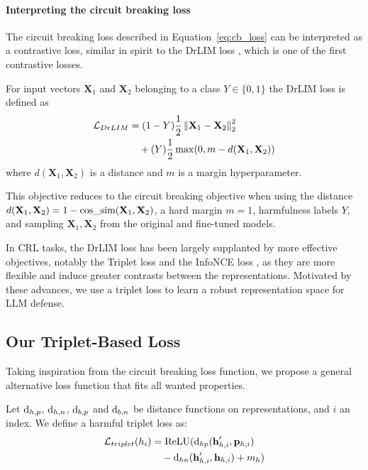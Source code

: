 \documentclass[11pt]{article}
\begin{document}
\paragraph{Interpreting the circuit breaking loss}
\label{sec:interpret_cb}
The circuit breaking loss described in Equation~\ref{eq:cb_loss}
can be interpreted as a contrastive loss, similar in spirit to the DrLIM loss \citep{hadsell2006dimensionality},
which is one of the first contrastive losses.
\newcommand{\bX}{\textbf{X}}

For input vectors $\bX_1$ and $\bX_2$ belonging to a class $Y \in \{0, 1\}$ the DrLIM loss is defined as
\begin{align}
\mathcal{L}_{DrLIM} &= (1 - Y) \frac{1}{2} \norm{\bX_1 - \bX_2}_2^2 \notag \\
&\quad+ (Y) \frac{1}{2} \max(0, m - d(\bX_1, \bX_2))
\end{align}
where $d(\bX_1, \bX_2)$ is a distance and $m$ is a margin hyperparameter.

This objective reduces to the circuit breaking objective when using the distance $d(\bX_1, \bX_2) = 1 - \cossim(\bX_1, \bX_2)$, a hard margin $m = 1$, harmfulness labels $Y$, and sampling $\bX_1, \bX_2$ from the original and fine-tuned models.
 
In CRL tasks, the DrLIM loss has been largely supplanted by more effective objectives, notably the Triplet loss and the InfoNCE loss \citep{oord2019representationlearningcontrastivepredictive}, as they are more flexible and induce greater contrasts
between the representations. Motivated by these advances, we use a triplet loss to learn a robust representation space for LLM defense.

\subsection{Our Triplet-Based Loss}
\newcommand{\bp}{\mathbf{p}}
\newcommand{\bn}{\mathbf{n}}

Taking inspiration from the circuit breaking loss function, we propose a general alternative loss function that fits all wanted properties.

Let $\text{d}_{h,p}$, $\text{d}_{h,n}$, $\text{d}_{b,p}$ and $\text{d}_{b,n}$ be distance functions on representations, and $i$ an index.
We define a harmful triplet loss as:
\begin{align}
\mathcal{L}_{triplet}(h_i) &= \ReLU (\text{d}_{hp}(\hp_{h,i}, \bp_{h,i}) \notag\\
  &\quad- \text{d}_{hn}(\hp_{h,i}, \h_{h,i}) + m_h)
\end{align}
\end{document}
